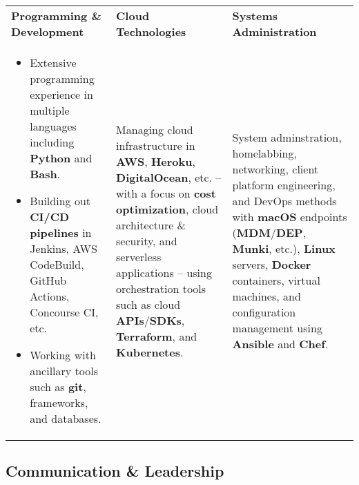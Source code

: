 \documentclass[10pt]{article}
\newcommand{\afterlistspace}[0]{\vspace{-1.5em}}
\begin{document}
\begin{tabularx}{\linewidth}{
    >{\hsize=1\hsize}X|%
    >{\hsize=1\hsize}X|%
    >{\hsize=1\hsize}X%
  }
    \textbf{Programming \& Development}
    & \textbf{Cloud Technologies}
    & \textbf{Systems Administration}
    \\
    \begin{itemize}
        \vspace{-0.67em}

        \item Extensive programming experience in multiple languages including \textbf{Python} and \textbf{Bash}.

        \item Building out \textbf{CI/CD pipelines} in Jenkins, AWS CodeBuild, GitHub Actions, Concourse CI, etc.

        \item Working with ancillary tools such as \textbf{git}, frameworks, and databases.
        
        \afterlistspace
    \end{itemize}

    & Managing cloud infrastructure in \textbf{AWS}, \textbf{Heroku}, \textbf{DigitalOcean}, etc. -- with a focus on \textbf{cost optimization}, cloud architecture \& security, and serverless applications -- using orchestration tools such as cloud \textbf{APIs}/\textbf{SDKs}, \textbf{Terraform}, and \textbf{Kubernetes}.

    & System adminstration, homelabbing, networking, client platform engineering, and DevOps methods with \textbf{macOS} endpoints (\textbf{MDM}/\textbf{DEP}, \textbf{Munki}, etc.), \textbf{Linux} servers, \textbf{Docker} containers, virtual machines, and configuration management using \textbf{Ansible} and \textbf{Chef}.
    
\end{tabularx}


\subsection{Communication \& Leadership}
\end{document}
